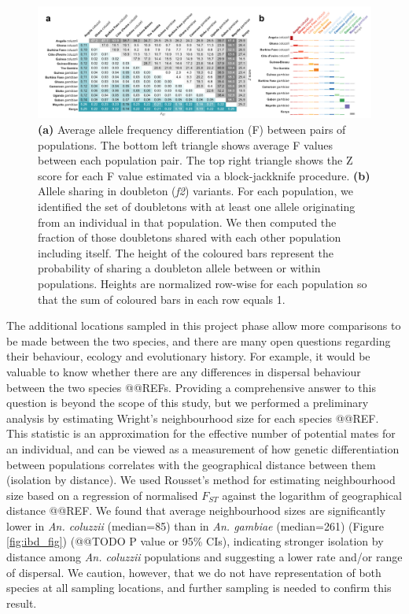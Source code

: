 \documentclass[a4paper,11pt,abstracton,hidelinks]{scrartcl}
\begin{document}
\begin{figure}[H]
	\begin{center}
		\includegraphics*[width=6.3in]{artwork/structure_composite.pdf}
	\end{center}
	\caption{\textbf{(a)} Average allele frequency differentiation (F) between pairs of populations. The bottom left triangle shows average F values between each population pair. The top right triangle shows the Z score for each F value estimated via a block-jackknife procedure. \textbf{(b)} Allele sharing in doubleton (\textit{f2}) variants. For each population, we identified the set of doubletons with at least one allele originating from an individual in that population. We then computed the fraction of those doubletons shared with each other population including itself. The height of the coloured bars represent the probability of sharing a doubleton allele between or within populations. Heights are normalized row-wise for each population so that the sum of coloured bars in each row equals 1.
}
	\label{fstdbl}
\end{figure}


%
The additional locations sampled in this project phase allow more comparisons to be made between the two species, and there are many open questions regarding their behaviour, ecology and evolutionary history.
%
For example, it would be valuable to know whether there are any differences in dispersal behaviour between the two species @@REFs. 
%
Providing a comprehensive answer to this question is beyond the scope of this study, but we performed a preliminary analysis by estimating Wright's neighbourhood size for each species @@REF.
%
This statistic is an approximation for the effective number of potential mates for an individual, and can be viewed as a measurement of how genetic differentiation between populations correlates with the geographical distance between them (isolation by distance).
%
We used Rousset's method for estimating neighbourhood size based on a regression of normalised $F_{ST}$ against the logarithm of geographical distance @@REF.
%
We found that average neighbourhood sizes are significantly lower in \textit{An. coluzzii} (median=85) than in \textit{An. gambiae} (median=261) (Figure \ref{fig:ibd_fig}) (@@TODO P value or 95\% CIs), indicating stronger isolation by distance among \textit{An. coluzzii} populations and suggesting a lower rate and/or range of dispersal.
%
We caution, however, that we do not have representation of both species at all sampling locations, and further sampling is needed to confirm this result.
\end{document}
